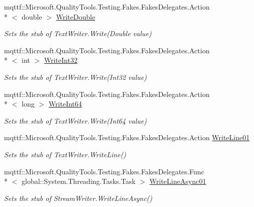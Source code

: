 \begin{DoxyCompactItemize}
mqttf\-::\-Microsoft.\-Quality\-Tools.\-Testing.\-Fakes.\-Fakes\-Delegates.\-Action\\*
$<$ double $>$ \hyperlink{class_system_1_1_i_o_1_1_fakes_1_1_stub_stream_writer_a54d3b2567a7ce1992d64830c69ea57ce}{Write\-Double}
\begin{DoxyCompactList}\small\item\em Sets the stub of Text\-Writer.\-Write(\-Double value)\end{DoxyCompactList}\item 
mqttf\-::\-Microsoft.\-Quality\-Tools.\-Testing.\-Fakes.\-Fakes\-Delegates.\-Action\\*
$<$ int $>$ \hyperlink{class_system_1_1_i_o_1_1_fakes_1_1_stub_stream_writer_a50ec12a04737d3349253ddefab32344b}{Write\-Int32}
\begin{DoxyCompactList}\small\item\em Sets the stub of Text\-Writer.\-Write(\-Int32 value)\end{DoxyCompactList}\item 
mqttf\-::\-Microsoft.\-Quality\-Tools.\-Testing.\-Fakes.\-Fakes\-Delegates.\-Action\\*
$<$ long $>$ \hyperlink{class_system_1_1_i_o_1_1_fakes_1_1_stub_stream_writer_a8dffd8bcd8863c3479beaf3b11e19ad0}{Write\-Int64}
\begin{DoxyCompactList}\small\item\em Sets the stub of Text\-Writer.\-Write(\-Int64 value)\end{DoxyCompactList}\item 
mqttf\-::\-Microsoft.\-Quality\-Tools.\-Testing.\-Fakes.\-Fakes\-Delegates.\-Action \hyperlink{class_system_1_1_i_o_1_1_fakes_1_1_stub_stream_writer_af63b422507340537e48c4725fc003bfd}{Write\-Line01}
\begin{DoxyCompactList}\small\item\em Sets the stub of Text\-Writer.\-Write\-Line()\end{DoxyCompactList}\item 
mqttf\-::\-Microsoft.\-Quality\-Tools.\-Testing.\-Fakes.\-Fakes\-Delegates.\-Func\\*
$<$ global\-::\-System.\-Threading.\-Tasks.\-Task $>$ \hyperlink{class_system_1_1_i_o_1_1_fakes_1_1_stub_stream_writer_af6b14b5f06428bd4406e493b9b83dae7}{Write\-Line\-Async01}
\begin{DoxyCompactList}\small\item\em Sets the stub of Stream\-Writer.\-Write\-Line\-Async()\end{DoxyCompactList}\item 

\end{DoxyCompactItemize}
